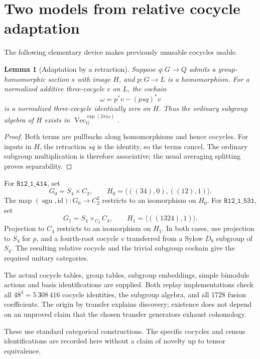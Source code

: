 \documentclass[11pt]{article}
\newtheorem{lemma}[theorem]{Lemma}
\newcommand{\R}[1]{\texttt{R12\_1\_#1}}
\renewcommand{\Vec}{\operatorname{Vec}}
\begin{document}
\section{Two models from relative cocycle adaptation}
The following elementary device makes previously unusable cocycles usable.

\begin{lemma}[Adaptation by a retraction]
Suppose $q:G\to Q$ admits a group-homomorphic section $s$ with image $H$,
and $p:G\to L$ is a homomorphism. For a normalized additive three-cocycle
$v$ on $L$, the cochain
\[
\omega=p^*v-(psq)^*v
\]
is a normalized three-cocycle identically zero on $H$. Thus the ordinary
subgroup algebra of $H$ exists in $\Vec_G^{\exp(2\pi i\omega)}$.
\end{lemma}
\begin{proof}
Both terms are pullbacks along homomorphisms and hence cocycles.
For inputs in $H$, the retraction $sq$ is the identity, so the terms
cancel. The ordinary subgroup multiplication is therefore associative;
the usual averaging splitting proves separability.
\end{proof}

For $\R{414}$, set
\[
G_0=S_4\times C_2,\qquad
H_0=\langle((34),0),((12),1)\rangle.
\]
The map $(\operatorname{sgn},\mathrm{id}):G_0\to C_2^2$ restricts to an
isomorphism on $H_0$. For $\R{531}$, set
\[
G_1=S_4\times_{C_2}C_4,\qquad
H_1=\langle((1324),1)\rangle.
\]
Projection to $C_4$ restricts to an isomorphism on $H_1$. In both cases,
use projection to $S_4$ for $p$, and a fourth-root cocycle $v$ transferred
from a Sylow $D_8$ subgroup of $S_4$. The resulting relative cocycle and
the trivial subgroup cochain give the required unitary categories.

The actual cocycle tables, group tables, subgroup embeddings, simple
bimodule actions and basis identifications are supplied. Both replay
implementations check all $48^4=5\,308\,416$ cocycle identities, the
subgroup algebra, and all 1728 fusion coefficients. The origin by transfer
explains discovery; existence does not depend on an unproved claim that
the chosen transfer generators exhaust cohomology.

These use standard categorical constructions. The specific cocycles and
census identifications are recorded here without a claim of novelty up
to tensor equivalence.
\end{document}
